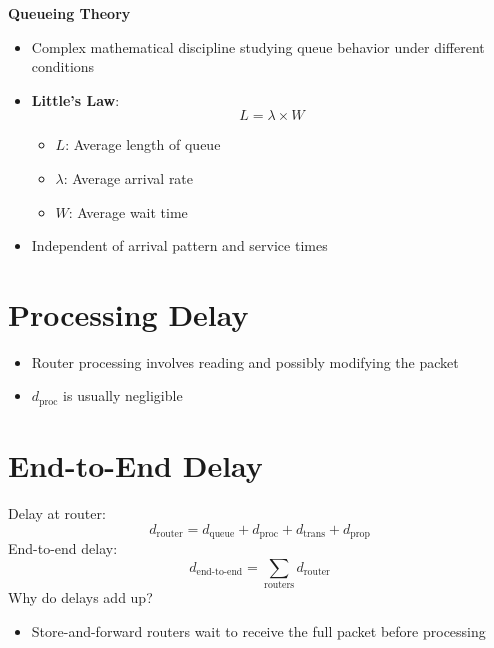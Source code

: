 \documentclass[9pt]{extarticle}
\begin{document}
\begin{multicols*}{3}
\textbf{Queueing Theory}
\begin{itemize}
    \item Complex mathematical discipline studying queue behavior under different conditions
    \item \textbf{Little's Law}:
    \[
    L = \lambda \times W
    \]
    \begin{itemize}
        \item \( L \): Average length of queue
        \item \( \lambda \): Average arrival rate
        \item \( W \): Average wait time
    \end{itemize}
    \item Independent of arrival pattern and service times
\end{itemize}

{\color{sectioncolor}\section*{\centering Processing Delay}}
\begin{itemize}
    \item Router processing involves reading and possibly modifying the packet
    \item \( d_{\text{proc}} \) is usually negligible
\end{itemize}

{\color{sectioncolor}\section*{\centering End-to-End Delay}}
Delay at router:
\[
d_{\text{router}} = d_{\text{queue}} + d_{\text{proc}} + d_{\text{trans}} + d_{\text{prop}}
\]
End-to-end delay:
\[
d_{\text{end-to-end}} = \sum_{\text{routers}} d_{\text{router}}
\]
Why do delays add up?
\begin{itemize}
    \item Store-and-forward routers wait to receive the full packet before processing
\end{itemize}


\end{multicols*}
\end{document}
